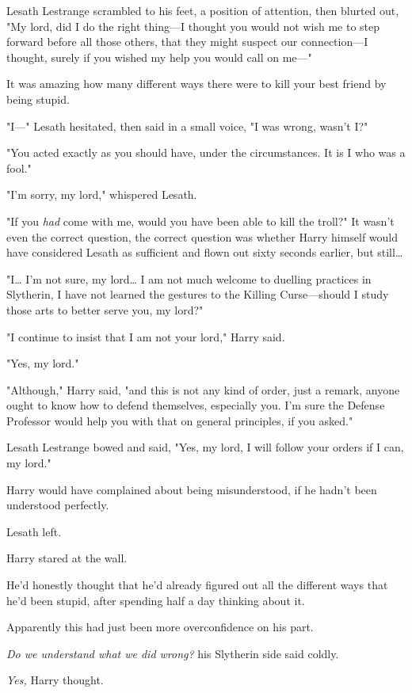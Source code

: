Lesath Lestrange scrambled to his feet, a position of attention, then blurted 
out, "My lord, did I do the right thing---I thought you would not wish me to 
step forward before all those others, that they might suspect our 
connection---I thought, surely if you wished my help you would call on me---"

It was amazing how many different ways there were to kill your best friend by 
being stupid.

"I---" Lesath hesitated, then said in a small voice, "I was wrong, wasn't I?"

"You acted exactly as you should have, under the circumstances. It is I who was 
a fool."

"I'm sorry, my lord," whispered Lesath.

"If you \emph{had} come with me, would you have been able to kill the troll?" 
It wasn't even the correct question, the correct question was whether Harry 
himself would have considered Lesath as sufficient and flown out sixty seconds 
earlier, but still{\ldots}

"I{\ldots} I'm not sure, my lord{\ldots} I am not much welcome to duelling 
practices in Slytherin, I have not learned the gestures to the Killing 
Curse---should I study those arts to better serve you, my lord?"

"I continue to insist that I am not your lord," Harry said.

"Yes, my lord."

"Although," Harry said, "and this is not any kind of order, just a remark, 
anyone ought to know how to defend themselves, especially you. I'm sure the 
Defense Professor would help you with that on general principles, if you asked."

Lesath Lestrange bowed and said, "Yes, my lord, I will follow your orders if I 
can, my lord."

Harry would have complained about being misunderstood, if he hadn't been 
understood perfectly.

Lesath left.

Harry stared at the wall.

He'd honestly thought that he'd already figured out all the different ways that 
he'd been stupid, after spending half a day thinking about it.

Apparently this had just been more overconfidence on his part.

\emph{Do we understand what we did wrong?} his Slytherin side said coldly.

\emph{Yes,} Harry thought.

